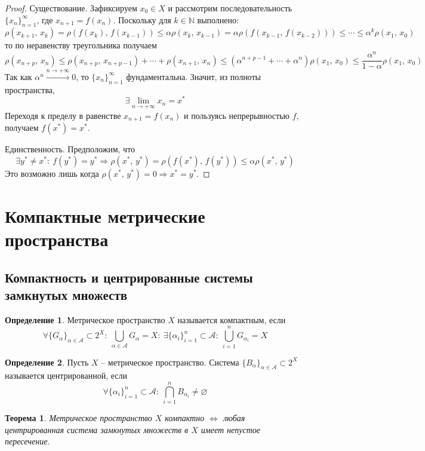 \documentclass[a4paper,12pt]{article}
\renewcommand{\leq}{\ensuremath{\leqslant}}
\renewcommand{\emptyset}{\ensuremath{\varnothing}}
\theoremstyle{plain}
\newtheorem{theorem}{Теорема}[section]
\theoremstyle{definition}
\newtheorem{definition}{Определение}[section]
\theoremstyle{remark}
\begin{document}
\begin{proof}
	Существование. Зафиксируем $x_0 \in X$ и рассмотрим последовательность $\{x_n\}_{n = 1}^\infty$, где $x_{n + 1} = f(x_n)$. Поскольку для $k \in \mathbb{N}$ выполнено:
	\[
		\rho(x_{k + 1},\, x_k) = \rho(f(x_k),\, f(x_{k - 1})) \leq \alpha\rho(x_k,\, x_{k - 1}) = \alpha\rho(f(x_{k - 1},\, f(x_{k - 2}))) \leq \cdots \leq \alpha^k\rho(x_1,\, x_0)
	\]
	то по неравенству треугольника получаем
	\[
		\rho(x_{n + p},\, x_n) \leq \rho(x_{n + p},\, x_{n + p - 1}) + \cdots + \rho(x_{n + 1},\, x_n) \leq (\alpha^{n + p - 1} + \cdots + \alpha^n) \rho(x_1,\, x_0) \leq \frac{\alpha^n}{1 - \alpha}\rho(x_1,\, x_0)
	\]
	Так как $\alpha^n \overset{n \to +\infty}{\to} 0$, то $\{x_n\}_{n = 1}^\infty$ фундаментальна. Значит, из полноты пространства,
	\[
		\exists \lim_{n \to +\infty} x_n = x^*
	\]
	Переходя к пределу в равенстве $x_{n + 1} = f(x_n)$ и пользуясь непрерывностью $f$, получаем $f(x^*) = x^*$.

	Единственность. Предположим, что
	\[
		\exists y^* \neq x^* :\: f(y^*) = y^* \Rightarrow \rho(x^*,\, y^*) = \rho(f(x^*),\, f(y^*)) \leq \alpha\rho(x^*,\, y^*)
	\]
	Это возможно лишь когда $\rho(x^*,\, y^*) = 0 \Rightarrow x^* = y^*$.
\end{proof}

\section{Компактные метрические пространства}
\subsection{Компактность и центрированные системы замкнутых множеств}
\begin{definition}
	Метрическое пространство $X$ называется компактным, если
	\[
		\forall \{G_\alpha\}_{\alpha \in \mathcal{A}} \subset 2^X :\: \bigcup_{\alpha \in \mathcal{A}} G_\alpha = X :\: \exists \{\alpha_i\}_{i = 1}^n \subset \mathcal{A} :\: \bigcup_{i = 1}^n G_{\alpha_i} = X
	\]
\end{definition}

\begin{definition}
	Пусть $X$ -- метрическое пространство. Система $\{B_\alpha\}_{\alpha \in \mathcal{A}} \subset 2^X$ называется центрированной, если
	\[
		\forall \{\alpha_i\}_{i=1}^n \subset \mathcal{A} :\: \bigcap_{i = 1}^n B_{\alpha_i} \neq \emptyset
	\]
\end{definition}

\begin{theorem}
	Метрическое пространство $X$ компактно $\Leftrightarrow$ любая центрированная система замкнутых множеств в $X$ имеет непустое пересечение.
\end{theorem}
\end{document}
